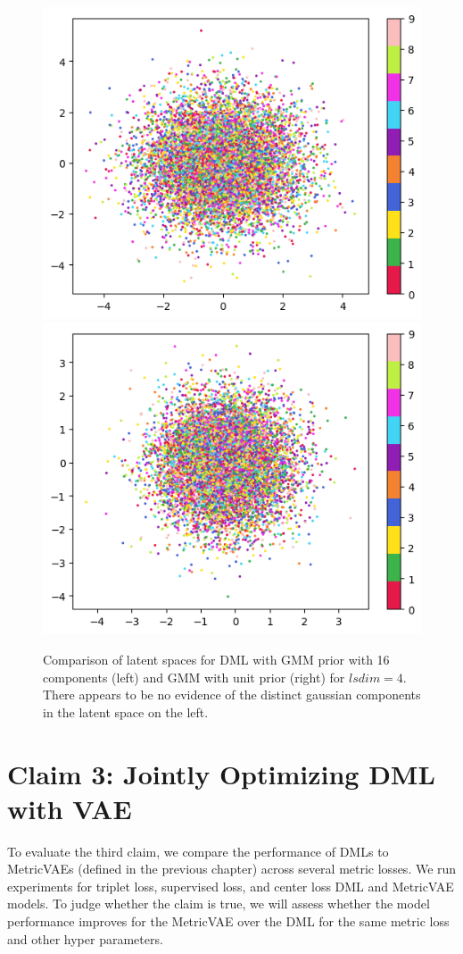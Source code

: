 \documentclass[./dissertation.tex]{subfiles}
\begin{document}
   \begin{figure}
       \centering
       \includegraphics[width=.48\textwidth]{figures/gmm_lsdim4.png}
       \includegraphics[width=.48\textwidth]{figures/unit_lsdim4.png}
       \caption{Comparison of latent spaces for DML with GMM prior with 16 components (left) and GMM with unit prior (right) for $lsdim = 4$. There appears to be no evidence of the distinct gaussian components in the latent space on the left.}
       \label{fig:my_label}
   \end{figure}
   
    \section{Claim 3: Jointly Optimizing DML with VAE}
    To evaluate the third claim, we compare the performance of DMLs to MetricVAEs (defined in the previous chapter) across several metric losses. We run experiments for triplet loss, supervised loss, and center loss DML and MetricVAE models. To judge whether the claim is true, we will assess whether the model performance improves for the MetricVAE over the DML for the same metric loss and other hyper parameters. 
    
\end{document}
